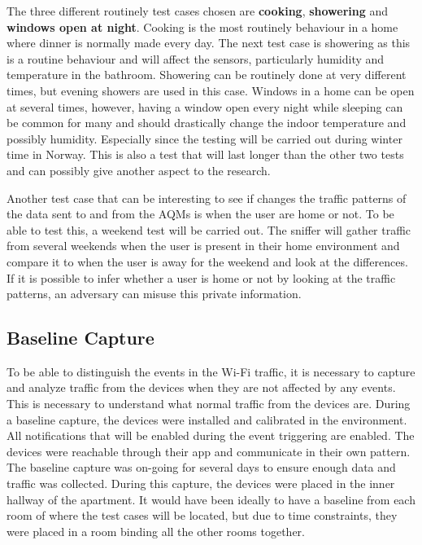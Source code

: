 The three different routinely test cases chosen are \textbf{cooking}, \textbf{showering} and \textbf{windows open at night}. Cooking is the most routinely behaviour in a home where dinner is normally made every day. The next test case is showering as this is a routine behaviour and will affect the sensors, particularly humidity and temperature in the bathroom. Showering can be routinely done at very different times, but evening showers are used in this case. Windows in a home can be open at several times, however, having a window open every night while sleeping can be common for many and should drastically change the indoor temperature and possibly humidity. Especially since the testing will be carried out during winter time in Norway. This is also a test that will last longer than the other two tests and can possibly give another aspect to the research. 

Another test case that can be interesting to see if changes the traffic patterns of the data sent to and from the \gls{AQM}s is when the user are home or not. To be able to test this, a weekend test will be carried out. The sniffer will gather traffic from several weekends when the user is present in their home environment and compare it to when the user is away for the weekend and look at the differences. If it is possible to infer whether a user is home or not by looking at the traffic patterns, an adversary can misuse this private information. 

\subsection{Baseline Capture}
To be able to distinguish the events in the \gls{Wi-Fi} traffic, it is necessary to capture and analyze traffic from the devices when they are not affected by any events. This is necessary to understand what normal traffic from the devices are. During a baseline capture, the devices were installed and calibrated in the environment. All notifications that will be enabled during the event triggering are enabled. The devices were reachable through their app and communicate in their own pattern. The baseline capture was on-going for several days to ensure enough data and traffic was collected. During this capture, the devices were placed in the inner hallway of the apartment. It would have been ideally to have a baseline from each room of where the test cases will be located, but due to time constraints, they were placed in a room binding all the other rooms together. 


